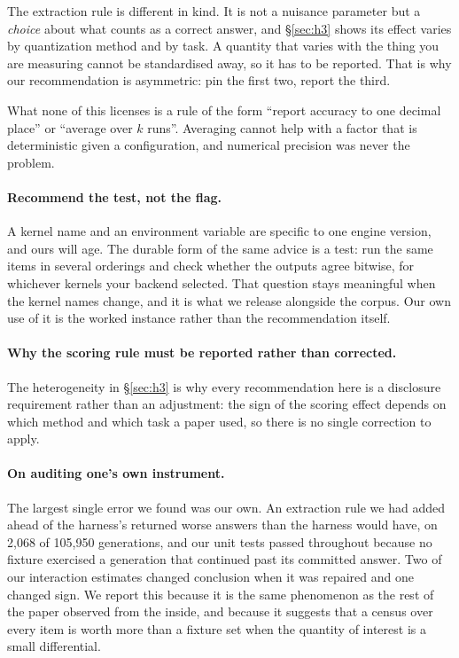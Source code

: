 \documentclass[11pt]{article}
\begin{document}
The extraction rule is different in kind. It is not a nuisance parameter but a
\emph{choice} about what counts as a correct answer, and \S\ref{sec:h3} shows its effect
varies by quantization method and by task. A quantity that varies with the thing you are
measuring cannot be standardised away, so it has to be reported. That is why our
recommendation is asymmetric: pin the first two, report the third.

What none of this licenses is a rule of the form ``report accuracy to one decimal place''
or ``average over $k$ runs''. Averaging cannot help with a factor that is deterministic
given a configuration, and numerical precision was never the problem.

\paragraph{Recommend the test, not the flag.}
A kernel name and an environment variable are specific to one engine version, and ours
will age. The durable form of the same advice is a test: run the same items in several
orderings and check whether the outputs agree bitwise, for whichever kernels your backend
selected. That question stays meaningful when the kernel names change, and it is what we
release alongside the corpus. Our own use of it is the worked instance rather than the
recommendation itself.

\paragraph{Why the scoring rule must be reported rather than corrected.}
The heterogeneity in \S\ref{sec:h3} is why every recommendation here is a
disclosure requirement rather than an adjustment: the sign of the scoring effect
depends on which method and which task a paper used, so there is no single
correction to apply.

\paragraph{On auditing one's own instrument.}
The largest single error we found was our own. An extraction rule we had added
ahead of the harness's returned worse answers than the harness would have, on
2{,}068 of 105{,}950 generations, and our unit tests passed throughout because no
fixture exercised a generation that continued past its committed answer. Two of
our interaction estimates changed conclusion when it was repaired and one changed
sign. We report this because it is the same phenomenon as the rest of the paper
observed from the inside, and because it suggests that a census over every item is
worth more than a fixture set when the quantity of interest is a small
differential.
\end{document}

